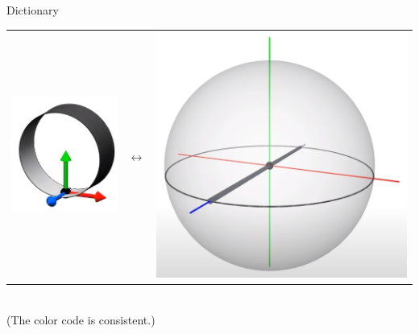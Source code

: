 \documentclass[10pt]{beamer}
\begin{document}
\begin{frame}{Dictionary}
\begin{center}
\begin{tabular}{m{3cm} m{2cm} m{3cm}}
        \includegraphics[scale=0.15]{Pictures/zaxisbelt.png} & $\longleftrightarrow$ & \includegraphics[scale=0.1]{Pictures/zaxissphere.png}
    \end{tabular}\\
    (The color code is consistent.)
    \end{center}
\end{frame}
\end{document}
